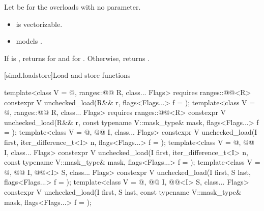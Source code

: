 \begin{itemdescr}
\pnum
Let  be  for the overloads with no  parameter.

\pnum
\constraints
\begin{itemize}
\item {} is vectorizable.
\item {} models .
\end{itemize}

\pnum
\returns
If  is , returns  for
 and  for
.
Otherwise, returns .
\end{itemdescr}

[simd.loadstore]{Load and store functions}

\begin{itemdecl}
template<class V = @\seebelow@, ranges::@@ R, class... Flags>
  requires ranges::@@<R>
  constexpr V unchecked_load(R&& r, flags<Flags...> f = {});
template<class V = @\seebelow@, ranges::@@ R, class... Flags>
  requires ranges::@@<R>
  constexpr V unchecked_load(R&& r, const typename V::mask_type& mask, flags<Flags...> f = {});
template<class V = @\seebelow@, @@ I, class... Flags>
  constexpr V unchecked_load(I first, iter_difference_t<I> n, flags<Flags...> f = {});
template<class V = @\seebelow@, @@ I, class... Flags>
  constexpr V unchecked_load(I first, iter_difference_t<I> n, const typename V::mask_type& mask,
                             flags<Flags...> f = {});
template<class V = @\seebelow@, @@ I, @@<I> S, class... Flags>
  constexpr V unchecked_load(I first, S last, flags<Flags...> f = {});
template<class V = @\seebelow@, @@ I, @@<I> S, class... Flags>
  constexpr V unchecked_load(I first, S last, const typename V::mask_type& mask,
                             flags<Flags...> f = {});
\end{itemdecl}

